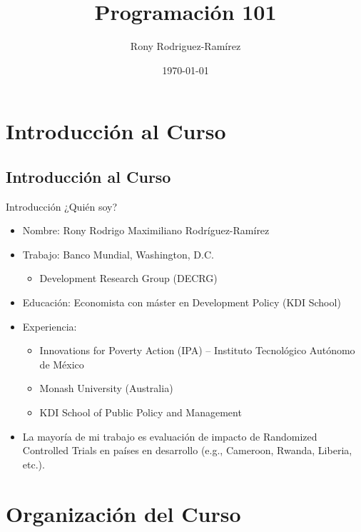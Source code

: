 \documentclass[11pt, aspectratio=169, compress]{beamer}
\title{Programación 101}
\author{Rony Rodriguez-Ramírez}
\institute{The World Bank | DIME \\ LAMBDA}
\date{\today}
\begin{document}
	
\begin{frame}[plain]
	\maketitle 
\end{frame}

\section{Introducción al Curso}
\subsection{Introducción al Curso}
\begin{frame}{Introducción}
	¿Quién soy? 
	\begin{itemize}
		\item Nombre: Rony Rodrigo Maximiliano Rodríguez-Ramírez
		\item Trabajo: Banco Mundial, Washington, D.C.  
		\begin{itemize}
			\item Development Research Group (DECRG)
		\end{itemize}
		\item Educación: Economista con máster en Development Policy (KDI School)
		\item Experiencia: 
		\begin{itemize}
			\item Innovations for Poverty Action (IPA) -- Instituto Tecnológico Autónomo de México
			\item Monash University (Australia)
			\item KDI School of Public Policy and Management
		\end{itemize} 
		\item La mayoría de mi trabajo es evaluación de impacto de Randomized Controlled Trials en países en desarrollo (e.g., Cameroon, Rwanda, Liberia, etc.).
	\end{itemize}
\end{frame}
\section{Organización del Curso}
\end{document}
